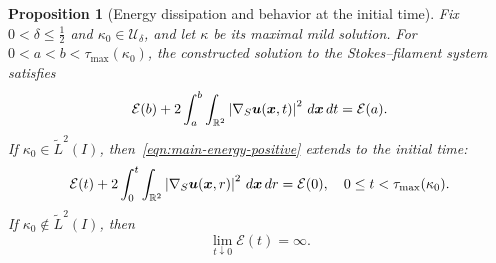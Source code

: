 \documentclass[11pt,reqno]{amsart}
\theoremstyle{plain}
\newtheorem{proposition}[theorem]{Proposition}
\theoremstyle{definition}
\numberwithin{equation}{section}
\newcommand{\grad}[1]{\nabla #1}
\newcommand{\mc}[1]{\mathcal{#1}}
\newcommand{\wt}[1]{\widetilde{#1}}
\newcommand{\bm}[1]{\boldsymbol{#1}}
\newcommand{\abs}[1]{\left\lvert #1 \right\rvert}
\newcommand{\R}{\mathbb{R}}
\begin{document}
\begin{proposition}[Energy dissipation and behavior at the initial time]
\label{prop:main-energy-identity}
Fix $0<\delta\le\frac12$ and $\kappa_0\in\mc U_\delta$, and let $\kappa$ be its
maximal mild solution. For $0<a<b<\tau_{\mathrm{max}}(\kappa_0)$,
the constructed solution to the Stokes--filament system satisfies
\begin{equation}\label{eqn:main-energy-positive}
    \mc E(b)
    +2\int_a^b\int_{\R^2}\abs{\grad_S\bm u(\bm x,t)}^2\,d\bm x\,dt
    =\mc E(a).
\end{equation}
If $\kappa_0\in\wt L^2(I)$, then~\eqref{eqn:main-energy-positive} extends to the initial time:
\begin{equation}\label{eqn:main-energy-initial}
    \mc E(t)
    +2\int_0^t\int_{\R^2}
        \abs{\grad_S\bm u(\bm x,r)}^2\,d\bm x\,dr
    =\mc E(0),
    \quad 0\le t<\tau_{\mathrm{max}}(\kappa_0).
\end{equation}
If $\kappa_0\notin\wt L^2(I)$, then
\begin{equation}\label{eqn:main-infinite-initial-energy}
    \lim_{t\downarrow0}\mc E(t)=\infty.
\end{equation}
\end{proposition}
\end{document}
